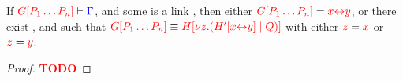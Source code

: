 \begin{lemmaB}\label{thm:nc-progress-link}
  If $\seq[{ \cpPlug{G}{P_1 \dots P_n} }]{ \Gamma }$, and some  is a
  link , then either $\tm{\cpPlug{G}{P_1 \dots P_n}} =
  \tm{\cpLink{x}{y}}$, or there exist ,  and  such that
  \(
  \tm{\cpPlug{G}{P_1 \dots P_n}} \equiv
  \tm{\cpPlug{H}{\cpCut{z}{\cpPlug{H'}{\cpLink{x}{y}}}{Q}}}
  \)
  with either $\tm{z} = \tm{x}$ or $\tm{z} = \tm{y}$.
\end{lemmaB}
\begin{proof}
  \textcolor{red}{\bfseries TODO}
\end{proof}
